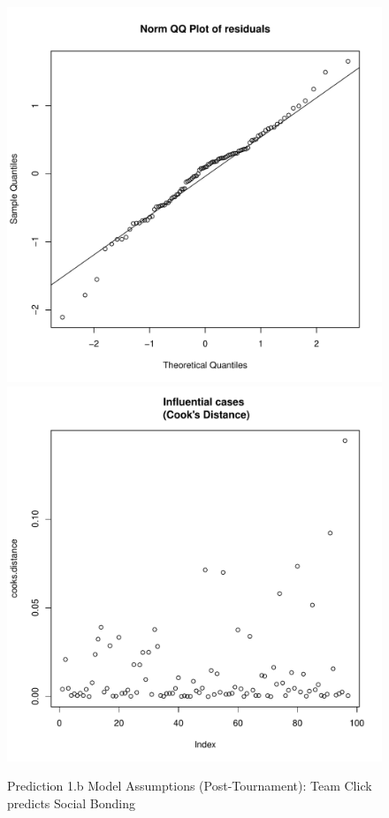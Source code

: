 \begin{CJK}{UTF8}{gbsn}
\begin{figure}[htbp]
                \includegraphics[scale =.4]{images/MLM2aQQNorm.pdf}
                \includegraphics[scale =.4]{images/MLM2aCooksD.pdf}
                \caption{Prediction 1.b Model Assumptions (Post-Tournament): Team Click predicts Social Bonding}
                \label{fig:MLM2aAssumptions}
              \end{figure}





\end{CJK}
